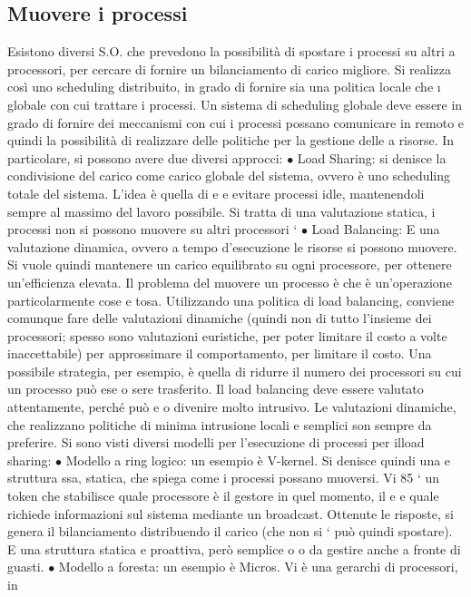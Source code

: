 \documentclass[a4paper,12pt]{article}
\begin{document}
\subsection{Muovere i processi}
Esistono diversi S.O. che prevedono la possibilità di spostare i processi su altri
a
processori, per cercare di fornire un bilanciamento di carico migliore. Si realizza
così uno scheduling distribuito, in grado di fornire sia una politica locale che
\i{}
globale con cui trattare i processi. Un sistema di scheduling globale deve essere
in grado di fornire dei meccanismi con cui i processi possano comunicare in
remoto e quindi la possibilità di realizzare delle politiche per la gestione delle
a
risorse.
In particolare, si possono avere due diversi approcci:
$\bullet$ Load Sharing: si denisce la condivisione del carico come carico globale
del sistema, ovvero è uno scheduling totale del sistema. L'idea è quella di
e
e
evitare processi idle, mantenendoli sempre al massimo del lavoro possibile.
Si tratta di una valutazione statica, i processi non si possono muovere su
altri processori
`
$\bullet$ Load Balancing: E una valutazione dinamica, ovvero a tempo d'esecuzione
le risorse si possono muovere. Si vuole quindi mantenere un carico equilibrato su ogni processore, per ottenere
un'efficienza elevata.
Il problema del muovere un processo è che è un'operazione particolarmente cose
e
tosa. Utilizzando una politica di load balancing, conviene comunque fare delle
valutazioni dinamiche (quindi non di tutto l'insieme dei processori; spesso sono
valutazioni euristiche, per poter limitare il costo a volte inaccettabile) per approssimare il comportamento, per
limitare il costo. Una possibile strategia, per
esempio, è quella di ridurre il numero dei processori su cui un processo può ese
o
sere trasferito. Il load balancing deve essere valutato attentamente, perché può
e o
divenire molto intrusivo. Le valutazioni dinamiche, che realizzano politiche di
minima intrusione locali e semplici son sempre da preferire.
Si sono visti diversi modelli per l'esecuzione di processi per ilload sharing:
$\bullet$ Modello a ring logico: un esempio è V-kernel. Si denisce quindi una
e
struttura ssa, statica, che spiega come i processi possano muoversi. Vi
85
` un token che stabilisce quale processore è il gestore in quel momento, il
e
e
quale richiede informazioni sul sistema mediante un broadcast. Ottenute
le risposte, si genera il bilanciamento distribuendo il carico (che non si
`
può quindi spostare). E una struttura statica e proattiva, però semplice
o
o
da gestire anche a fronte di guasti.
$\bullet$ Modello a foresta: un esempio è Micros. Vi è una gerarchi di processori, in
\end{document}
